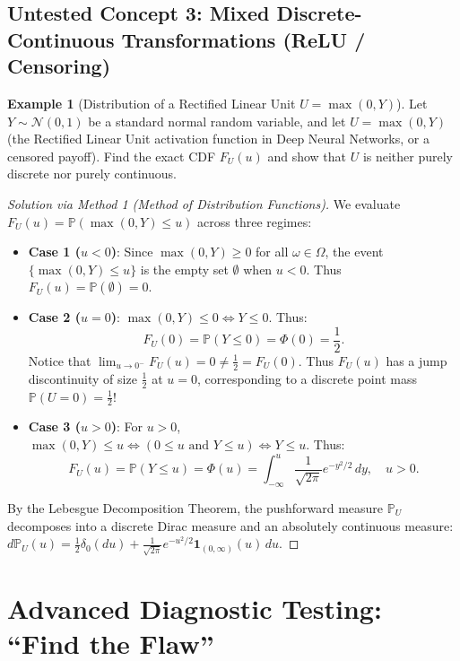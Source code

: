 \documentclass[11pt, letterpaper]{article}
\theoremstyle{definition}
\newtheorem{example}{Example}[section]
\theoremstyle{remark}
\newcommand{\Prob}{\mathbb{P}}
\begin{document}
\begin{itemize}
\subsection{Untested Concept 3: Mixed Discrete-Continuous Transformations (ReLU / Censoring)}

\begin{example}[Distribution of a Rectified Linear Unit $U = \max(0, Y)$]
Let $Y \sim \mathcal{N}(0, 1)$ be a standard normal random variable, and let $U = \max(0, Y)$ (the Rectified Linear Unit activation function in Deep Neural Networks, or a censored payoff). Find the exact CDF $F_U(u)$ and show that $U$ is neither purely discrete nor purely continuous.
\end{example}

\begin{proof}[Solution via Method 1 (Method of Distribution Functions)]
We evaluate $F_U(u) = \Prob(\max(0, Y) \le u)$ across three regimes:
\begin{itemize}
    \item \textbf{Case 1 ($u < 0$)}: Since $\max(0, Y) \ge 0$ for all $\omega \in \Omega$, the event $\{\max(0, Y) \le u\}$ is the empty set $\emptyset$ when $u < 0$. Thus $F_U(u) = \Prob(\emptyset) = 0$.
    \item \textbf{Case 2 ($u = 0$)}: $\max(0, Y) \le 0 \iff Y \le 0$. Thus:
    \[
        F_U(0) = \Prob(Y \le 0) = \Phi(0) = \frac{1}{2}.
    \]
    Notice that $\lim_{u \to 0^-} F_U(u) = 0 \neq \frac{1}{2} = F_U(0)$. Thus $F_U(u)$ has a jump discontinuity of size $\frac{1}{2}$ at $u = 0$, corresponding to a discrete point mass $\Prob(U = 0) = \frac{1}{2}$!
    \item \textbf{Case 3 ($u > 0$)}: For $u > 0$, $\max(0, Y) \le u \iff (0 \le u \text{ and } Y \le u) \iff Y \le u$. Thus:
    \[
        F_U(u) = \Prob(Y \le u) = \Phi(u) = \int_{-\infty}^u \frac{1}{\sqrt{2\pi}} e^{-y^2/2} \, dy, \quad u > 0.
    \]
\end{itemize}
By the Lebesgue Decomposition Theorem, the pushforward measure $\Prob_U$ decomposes into a discrete Dirac measure and an absolutely continuous measure: $d\Prob_U(u) = \frac{1}{2}\delta_0(du) + \frac{1}{\sqrt{2\pi}}e^{-u^2/2}\mathbf{1}_{(0, \infty)}(u)\,du$.
\end{proof}

\newpage
\section{Advanced Diagnostic Testing: ``Find the Flaw''}


\end{itemize}
\end{document}
